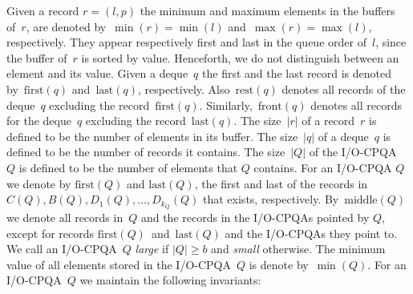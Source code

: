 \documentclass[]{article}
\newcommand{\front}{\text{front}}
\newcommand{\first}{\text{first}}
\newcommand{\midd}{\text{middle}}
\newcommand{\last}{\text{last}}
\newcommand{\rest}{\text{rest}}
\begin{document}
Given a record $r =(l,p)$ the minimum and maximum elements in the buffers
of~$r$, are denoted by~$\min(r) = \min(l)$ and~$\max(r) = \max(l)$,
respectively. They appear respectively first and last in the queue order of~$l$,
since the buffer of~$r$ is sorted by value. Henceforth, we do not distinguish
between an element and its value.  Given a deque~$q$ the first and the last
record is denoted by~$\first(q)$ and~$\last(q)$, respectively. Also~$\rest(q)$
denotes all records of the deque~$q$ excluding the record~$\first(q)$.
Similarly,~$\front (q)$ denotes all records for the deque~$q$ excluding the
record~$\last(q)$. The size~$|r|$ of a record~$r$ is defined to be the number of
elements in its buffer. The size~$|q|$ of a deque~$q$ is defined to be the
number of records it contains. The size~$|Q|$ of the I/O-CPQA~$Q$ is defined to
be the number of elements that $Q$ contains. For an I/O-CPQA $Q$ we denote by
$\first(Q)$ and $\last(Q)$, the first and last of the records in $C(Q), B(Q),
D_1(Q), \ldots, D_{k_Q}(Q)$ that exists, respectively. By~$\midd(Q)$ we denote
all records in~$Q$ and the records in the I/O-CPQAs pointed by $Q$, except for
records $\first(Q)$~and~$\last(Q)$ and the I/O-CPQAs they point to. We call an
I/O-CPQA~$Q$ \emph{large} if $|Q| \geq b$ and \emph{small} otherwise.  The
minimum value of all elements stored in the I/O-CPQA~$Q$ is denote by~$\min(Q)$.
For an I/O-CPQA~$Q$ we maintain the following invariants:
\end{document}
